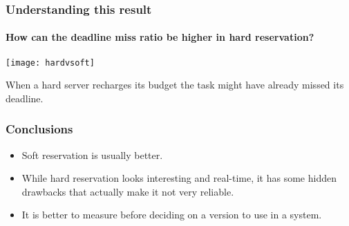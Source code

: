 \documentclass{beamer}
\begin{document}
\begin{frame}
  \frametitle{Understanding this result}
  \framesubtitle{How can the deadline miss ratio be higher in hard
    reservation?}
    \texttt{[image: hardvsoft]}
    
    \vspace{1cm}
    
    When a hard server recharges its budget the task might have
    already missed its deadline.
\end{frame}

\begin{frame}
  \frametitle{Conclusions}
  \begin{itemize}
  \item Soft reservation is usually better.
  \item While hard reservation looks interesting and real-time, it
    has some hidden drawbacks that actually make it not very reliable.
  \item It is better to measure before deciding on a version to use in
    a system.
  \end{itemize}
  
\end{frame}
\end{document}
